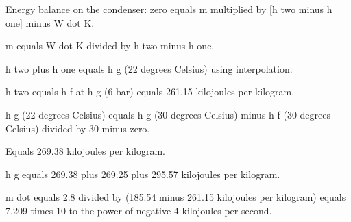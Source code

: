 Energy balance on the condenser: zero equals m multiplied by [h two minus h one] minus W dot K.

m equals W dot K divided by h two minus h one.

h two plus h one equals h g (22 degrees Celsius) using interpolation.

h two equals h f at h g (6 bar) equals 261.15 kilojoules per kilogram.

h g (22 degrees Celsius) equals h g (30 degrees Celsius) minus h f (30 degrees Celsius) divided by 30 minus zero.

Equals 269.38 kilojoules per kilogram.

h g equals 269.38 plus 269.25 plus 295.57 kilojoules per kilogram.

m dot equals 2.8 divided by (185.54 minus 261.15 kilojoules per kilogram) equals 7.209 times 10 to the power of negative 4 kilojoules per second.
